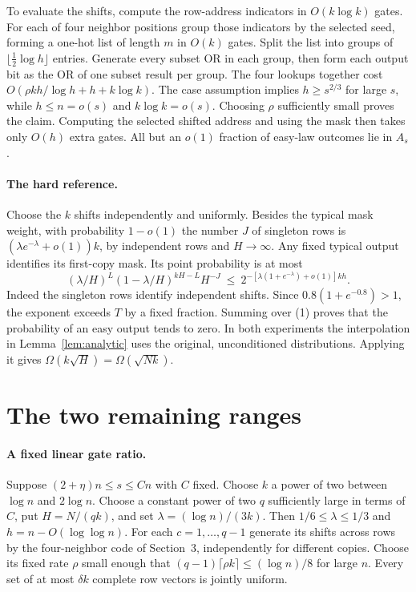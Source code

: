 \documentclass[11pt]{article}
\begin{document}
To evaluate the shifts, compute the row-address indicators in $O(k\log k)$ gates. For each of four neighbor positions group those indicators by the selected seed, forming a one-hot list of length $m$ in $O(k)$ gates. Split the list into groups of $\lfloor\tfrac12\log h\rfloor$ entries. Generate every subset OR in each group, then form each output bit as the OR of one subset result per group. The four lookups together cost $O(\rho kh/\log h+h+k\log k)$. The case assumption implies $h\ge s^{2/3}$ for large $s$, while $h\le n=o(s)$ and $k\log k=o(s)$. Choosing $\rho$ sufficiently small proves the claim. Computing the selected shifted address and using the mask then takes only $O(h)$ extra gates. All but an $o(1)$ fraction of easy-law outcomes lie in $A_s$.

\paragraph{The hard reference.}
Choose the $k$ shifts independently and uniformly. Besides the typical mask weight, with probability $1-o(1)$ the number $J$ of singleton rows is $(\lambda e^{-\lambda}+o(1))k$, by independent rows and $H\to\infty$. Any fixed typical output identifies its first-copy mask. Its point probability is at most
\[
      (\lambda/H)^L(1-\lambda/H)^{kH-L} H^{-J}
      \ \le\ 2^{-[\lambda(1+e^{-\lambda})+o(1)]kh}.
\]
Indeed the singleton rows identify independent shifts. Since $0.8(1+e^{-0.8})>1$, the exponent exceeds $T$ by a fixed fraction. Summing over (1) proves that the probability of an easy output tends to zero. In both experiments the interpolation in Lemma~\ref{lem:analytic} uses the original, unconditioned distributions. Applying it gives $\Omega(k\sqrt H)=\Omega(\sqrt{Nk})$.

\section{The two remaining ranges}
\paragraph{A fixed linear gate ratio.}
Suppose $(2+\eta)n\le s\le Cn$ with $C$ fixed. Choose $k$ a power of two between $\log n$ and $2\log n$. Choose a constant power of two $q$ sufficiently large in terms of $C$, put $H=N/(qk)$, and set $\lambda=(\log n)/(3k)$. Then $1/6\le\lambda\le1/3$ and $h=n-O(\log\log n)$. For each $c=1,\ldots,q-1$ generate its shifts across rows by the four-neighbor code of Section~3, independently for different copies. Choose its fixed rate $\rho$ small enough that $(q-1)\lceil\rho k\rceil\le (\log n)/8$ for large $n$. Every set of at most $\delta k$ complete row vectors is jointly uniform.
\end{document}
